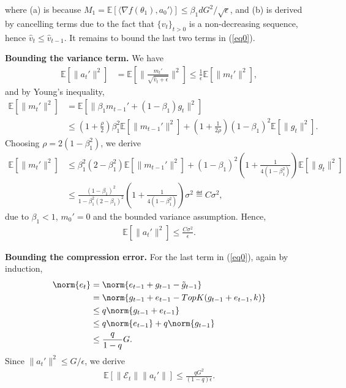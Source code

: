 \documentclass[11pt]{article}
\begin{document}
where (a) is because $M_1=\mathbb E[\langle\nabla f(\theta_1),a_0'\rangle]\leq \beta_1 d G^2/\sqrt{\epsilon}$, and (b) is derived by cancelling terms due to the fact that $\{\hat v_{t}\}_{t>0}$ is a non-decreasing sequence, hence $\hat v_{t}\leq \hat v_{t-1}$. 
It remains to bound the last two terms in (\ref{eq0}).

\textbf{Bounding the variance term.} We have
\begin{align*}
    \mathbb E[\|a_t'\|^2]&=\mathbb E[\|\frac{m_t'}{\sqrt{\hat v_t+\epsilon}}\|^2]\leq \frac{1}{\epsilon}\mathbb E[\|m_t'\|^2],
\end{align*}
and by Young's inequality,
\begin{align*}
    \mathbb E[\|m_t'\|^2]&=\mathbb E[\|\beta_1m_{t-1}'+(1-\beta_1)g_t\|^2]\\
    &\leq (1+\frac{\rho}{2})\beta_1^2 \mathbb E[\|m_{t-1}'\|^2]+(1+\frac{1}{2\rho})(1-\beta_1)^2 \mathbb E[\|g_t\|^2].
\end{align*}
Choosing $\rho=2(1-\beta_1^2)$, we derive
\begin{align*}
    \mathbb E[\|m_t'\|^2]&\leq \beta_1^2(2-\beta_1^2)\mathbb E[\|m_{t-1}'\|^2]+(1-\beta_1)^2(1+\frac{1}{4(1-\beta_1^2)})\mathbb E[\|g_t\|^2]\\
    &\leq \frac{(1-\beta_1)^2}{1-\beta_1^2(2-\beta_1)^2}(1+\frac{1}{4(1-\beta_1^2)})\sigma^2\eqdef C\sigma^2,
\end{align*}
due to $\beta_1<1$, $m_0'=0$ and the bounded variance assumption. Hence,
\begin{align*}
    \mathbb E[\|a_t'\|^2]\leq \frac{C\sigma^2}{\epsilon}.
\end{align*}

\textbf{Bounding the compression error.} For the last term in (\ref{eq0}), again by induction,
\begin{equation}\label{eq:ineqe_t}
\begin{split}
\norm{e_t} & = \norm{e_{t-1} + g_{t-1} - \tilde g_{t-1}}\\
& =  \norm{ g_{t-1} + e_{t-1} - TopK(g_{t-1}+e_{t-1},k)}\\
& \leq q \norm{g_{t-1} + e_{t-1}}\\
& \leq q \norm{ e_{t-1}}+ q \norm{g_{t-1}}\\
& \leq \frac{q}{1-q}G.
\end{split}
\end{equation}
Since $\|a_t'\|^2\leq G/\epsilon$, we derive
\begin{align*}
    \mathbb E[\| \mathcal E_t\| \|a_t'\|]\leq \frac{qG^2}{(1-q)\epsilon}.
\end{align*}
\end{document}
